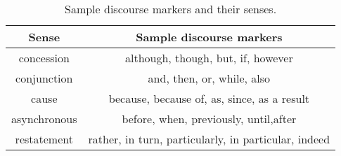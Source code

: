 \begin{table}[t]
\centering
{
	\fontsize{8}{9}\selectfont
    \setlength{\tabcolsep}{1.0mm}
    \renewcommand{\arraystretch}{1.1}
	\begin{tabular}{|c|c|}
 	\hline
  	\textbf{Sense} & \textbf{Sample discourse markers} \\
  	\hline
 	concession& although, though, but, if, however   \\
    \hline
 	conjunction& and, then, or, while, also \\
 	\hline
 	cause & because, because of, as, since, as a result  \\
 	\hline
 	asynchronous& before, when, previously, until,after \\
 	\hline
 	restatement& rather, in turn, particularly, in particular, indeed   \\
 \hline
\end{tabular}
}
\caption{\fontsize{10}{12}\selectfont Sample discourse markers and their senses.}
\label{tab:discourse_markers}
\vspace{-2ex}
\end{table}

